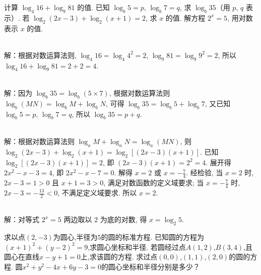 \documentclass{ctexart}
\newenvironment{MyAnswer}[1][] %
 {\begin{tcolorbox}[breakable, colframe=blue] \begin{Answer}[#1] \color{blue} \kaishu}  %
 {\end{Answer}\end{tcolorbox}}
\begin{document}
\begin{Exercise}[title={对数运算小练习2}, label={ex:logarithm2}]
    \Question 计算 $\log_4 16 + \log_9 81$ 的值.
    \Question 已知 $\log_b 5 = p$, $\log_b 7 = q$, 求 $\log_b 35$（用 $p$, $q$ 表示）.
    \Question 若 $\log_2 (2x - 3) + \log_2 (x + 1) = 2$, 求 $x$ 的值.
    \Question 解方程 $2^{x} = 5$, 用对数表示 $x$ 的值.
\end{Exercise}
\begin{MyAnswer}[ref={ex:logarithm2}]
        \Question {}\\ 解：根据对数运算法则, $\log_4 16 = \log_4 4^2 = 2$, $\log_9 81 = \log_9 9^2 = 2$, 所以 $\log_4 16 + \log_9 81 = 2 + 2 = 4$.

        \Question {}\\ 解：因为 $\log_b 35 = \log_b (5 \times 7)$, 根据对数运算法则 $\log_b(MN) = \log_b M + \log_b N$, 可得 $\log_b 35 = \log_b 5 + \log_b 7$, 又已知 $\log_b 5 = p$, $\log_b 7 = q$, 所以 $\log_b 35 = p + q$.

        \Question {}\\ 解：根据对数运算法则 $\log_a M + \log_a N = \log_a (MN)$, 则 $\log_2 (2x - 3) + \log_2 (x + 1) = \log_2 [(2x - 3)(x + 1)]$. 已知 $\log_2 [(2x - 3)(x + 1)] = 2$, 即 $(2x - 3)(x + 1) = 2^2 = 4$. 展开得 $2x^2 - x - 3 = 4$, 即 $2x^2 - x - 7 = 0$. 解得 $x = 2$ 或 $x = -\frac{7}{4}$. 经检验, 当 $x = 2$ 时, $2x - 3 = 1 > 0$ 且 $x + 1 = 3 > 0$, 满足对数函数的定义域要求; 当 $x = -\frac{7}{4}$ 时, $2x - 3 = -\frac{13}{2} < 0$, 不满足定义域要求. 所以 $x = 2$.

        \Question {}\\ 解：对等式 $2^x = 5$ 两边取以 $2$ 为底的对数, 得 $x = \log_2 5$.
\end{MyAnswer}






\begin{Exercise}[title={圆的基本性质练习}, label={ex:circle-properties},difficulty=3]
    \Question 求以点$(2, -3)$为圆心,半径为$5$的圆的标准方程.
    \Question 已知圆的方程为$(x + 1)^2+(y - 2)^2 = 9$,求圆心坐标和半径.
    \Question 若圆经过点$A(1,2)$,$B(3,4)$,且圆心在直线$x - y + 1 = 0$上,求该圆的方程.
    \Question 求过点$(0,0)$,$(1,1)$,$(2,0)$的圆的方程.
    \Question 圆$x^2 + y^2 - 4x + 6y - 3 = 0$的圆心坐标和半径分别是多少？
\end{Exercise}
\end{document}
